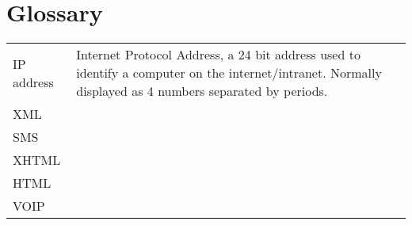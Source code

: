 \section{Glossary}

\begin{tabular}{l|p{12cm}}
IP address&Internet Protocol Address, a 24 bit address used to identify a computer on the internet/intranet.
Normally displayed as 4 numbers separated by periods.\\
XML&\\
SMS&\\
XHTML&\\
HTML&\\
VOIP&\\

\end{tabular}

